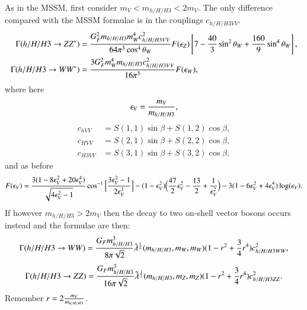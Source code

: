 \documentclass[final,3p,times]{elsarticle}
\begin{document}
As in the MSSM, first consider $m_V < m_{h/H/H3} < 2m_V$. The only difference compared with the MSSM formulae is in the couplings $c_{h/H/H3VV}$.
\begin{align} \label{hZZstarNMSSM}
\Gamma(h/H/H3 \rightarrow ZZ^*) &= {G_{F}^2 m_{h/H/H3} m_{W}^4 c_{h/H/H3VV}^2 \over 64 \pi^3 \cos^4\theta_W}
F(\epsilon_{Z}) \left[7 - {40 \over 3} \sin^2 \theta_W + {160 \over 9} \sin^4 \theta_W\right], \\ 
\Gamma(h/H/H3 \rightarrow WW^*) &= {3G_{F}^2 m_{W}^4 m_{h/H/H3} c_{h/H/H3VV}^2 \over 16 \pi^3}  F(\epsilon_{W}) , \label{hWWstarNMSSM}
\end{align}
where here
\begin{equation}
\epsilon_{V} = {m_V \over m_{h/H/H3}},
\end{equation}
\begin{align}
c_{hVV} &= S(1,1)\sin\beta + S(1,2)\cos\beta, \\
c_{HVV} &= S(2,1)\sin\beta + S(2,2)\cos\beta, \\
c_{H3VV} &= S(3,1)\sin\beta + S(3,2)\cos\beta,  
\end{align}
and as before
\begin{equation}
\begin{aligned}
F(\epsilon_{V}) = {3(1-8\epsilon_{V}^2 + 20\epsilon_{V}^4) \over \sqrt{4\epsilon_{V}^2-1}}\cos^{-1} \Big[{3\epsilon_{V}^2-1 \over 2\epsilon_{V}^3}\Big] - (1-\epsilon_{V}^2)\Big({47 \over 2}\epsilon_{V}^2 -{13 \over 2} + {1 \over \epsilon_{V}^2}\Big) - 3(1-6\epsilon_{V}^2+4\epsilon_{V}^4)\log(\epsilon_{V}).
\end{aligned}
\end{equation}
If however $m_{h/H/H3} > 2m_{V}$ then the decay to two on-shell vector bosons occurs instead and the formulae are then:
\begin{equation} \label{hWWNMSSM}
\Gamma(h/H/H3 \rightarrow WW) = {G_{F} m_{h/H/H3}^3 \over  8\pi \sqrt{2}} \tilde{\lambda}^{1 \over 2}(m_{h/H/H3},m_{W},m_{W})(1-r^2 + {3 \over 4}r^4)c_{h/H/H3WW}^2,
\end{equation}
\begin{equation} \label{hZZNMSSM}
\Gamma(h/H/H3 \rightarrow ZZ) = {G_{F} m_{h/H/H3}^3 \over 16\pi \sqrt{2}} \tilde{\lambda}^{1 \over 2}(m_{h/H/H3},m_{Z},m_{Z})(1-r^2 + {3 \over 4}r^4)c_{h/H/H3ZZ}^2.
\end{equation}
Remember $r = 2{m_{V} \over m_{h/H/H3}}$.
\end{document}
